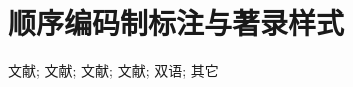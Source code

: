 \documentclass[twoside]{article}
\begin{document}
\section{顺序编码制标注与著录样式}

文献\cite{王夫之1845--}\cite{陈建军2010-93-93};
文献\parencite{张田勤2000--}\parencite{吴云芳2003--};
文献;
文献;
双语\cite{bilangzhang,bilangyi};
其它\cite{Calkin2011-8-9,CRAWFPRD1995--,Babu2014--,CALMS1965--,DESMARAIS1992-605-609}

\printbibliography[heading=subbibintoc,title=【参考文献】]
\end{document}
